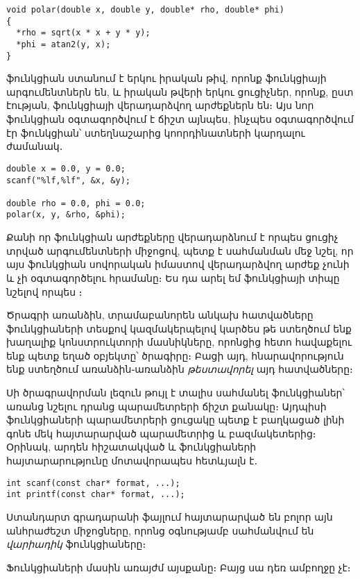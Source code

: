 \begin{Verbatim}
void polar(double x, double y, double* rho, double* phi)
{
  *rho = sqrt(x * x + y * y);
  *phi = atan2(y, x);
}
\end{Verbatim}

 ֆունկցիան ստանում է երկու իրական թիվ, որոնք ֆունկցիայի
արգումենտներն են, և իրական թվերի երկու ցուցիչներ, որոնք, ըստ էության,
ֆունկցիայի վերադարձվող արժեքներն են։ Այս նոր ֆունկցիան օգտագործվում է
ճիշտ այնպես, ինչպես օգտագործվում էր  ֆունկցիան՝ ստեղնաշարից
կոորդինատների կարդալու ժամանակ․

\begin{Verbatim}
double x = 0.0, y = 0.0;
scanf("%lf,%lf", &x, &y);

double rho = 0.0, phi = 0.0;
polar(x, y, &rho, &phi);
\end{Verbatim}

Քանի որ  ֆունկցիան արժեքները վերադարձնում է որպես ցուցիչ
տրված արգումենտների միջոցով, պետք է սահմանման մեջ նշել, որ այս ֆունկցիան
սովորական իմաստով վերադարձվող արժեք չունի և չի օգտագործելու 
հրամանը։ Ես դա արել եմ ֆունկցիայի տիպը նշելով որպես ։


Ծրագրի առանձին, տրամաբանորեն անկախ հատվածները ֆունկցիաների տեսքով
կազմակերպելով կարծես թե ստեղծում ենք խաղալիք կոնստրուկտորի մասնիկները,
որոնցից հետո հավաքելու ենք պետք եղած օբյեկտը՝ ծրագիրը։ Բացի այդ,
հնարավորություն ենք ստեղծում առանձին֊առանձին \emph{թեստավորել} այդ
հատվածները։


Սի ծրագրավորման լեզուն թույլ է տալիս սահմանել ֆունկցիաներ՝ առանց նշելու
դրանց պարամետրերի ճիշտ քանակը։ Այդպիսի ֆունկցիաների պարամետրերի ցուցակը
պետք է բաղկացած լինի գոնե մեկ հայտարարված պարամետրից և բազմակետերից։
Օրինակ, արդեն հիշատակված  և  ֆունկցիաների
հայտարարությունը մոտավորապես հետևյալն է․

\begin{Verbatim}
int scanf(const char* format, ...);
int printf(const char* format, ...);
\end{Verbatim}

Ստանդարտ գրադարանի  ֆայլում հայտարարված են բոլոր այն
անհրաժեշտ միջոցները, որոնց օգնությամբ սահմանվում են \emph{վարիադիկ}
ֆունկցիաները։

Ֆունկցիաների մասին առայժմ այսքանը։ Բայց սա դեռ ամբողջը չէ։
